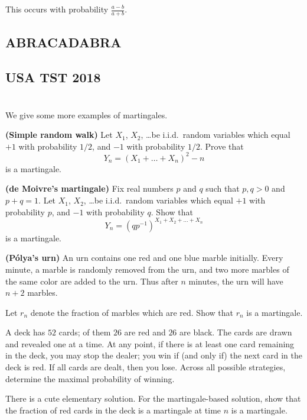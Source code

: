 
\begin{proposition}
	This occurs with probability $\frac{a-b}{a+b}$.
\end{proposition}


\subsection{ABRACADABRA}


\subsection{USA TST 2018}

\section{\problemhead}

\begin{problem}
	We give some more examples of martingales.
	\begin{enumerate}[(a)]
		\ii \textbf{(Simple random walk)}
		Let $X_1$, $X_2$, \dots be i.i.d.\ random variables
		which equal $+1$ with probability $1/2$,
		and $-1$ with probability $1/2$.
		Prove that
		\[ Y_n = \left( X_1 + \dots + X_n \right)^2 - n \]
		is a martingale.

		\ii \textbf{(de Moivre's martingale)}
		Fix real numbers $p$ and $q$ such that $p,q > 0$ and $p+q=1$.
		Let $X_1$, $X_2$, \dots be i.i.d.\ random variables
		which equal $+1$ with probability $p$,
		and $-1$ with probability $q$.
		Show that
		\[ Y_n = \left(qp^{-1}\right)^{X_1 + X_2 + \dots + X_n} \]
		is a martingale.

		\ii \textbf{(P\'{o}lya's urn)}
		An urn contains one red and one blue marble initially.
		Every minute, a marble is randomly removed from the urn,
		and two more marbles of the same color are added to the urn.
		Thus after $n$ minutes, the urn will have $n+2$ marbles.

		Let $r_n$ denote the fraction of marbles which are red.
		Show that $r_n$ is a martingale.
	\end{enumerate}
\end{problem}

\begin{problem}
	A deck has $52$ cards; of them $26$ are red and $26$ are black.
	The cards are drawn and revealed one at a time.
	At any point, if there is at least one card remaining in the deck,
	you may stop the dealer;
	you win if (and only if) the next card in the deck is red.
	If all cards are dealt, then you lose.
	Across all possible strategies,
	determine the maximal probability of winning.
	\begin{hint}
		There is a cute elementary solution.
		For the martingale-based solution,
		show that the fraction of red cards in the deck is a martingale
		at time $n$ is a martingale.
	\end{hint}
\end{problem}

